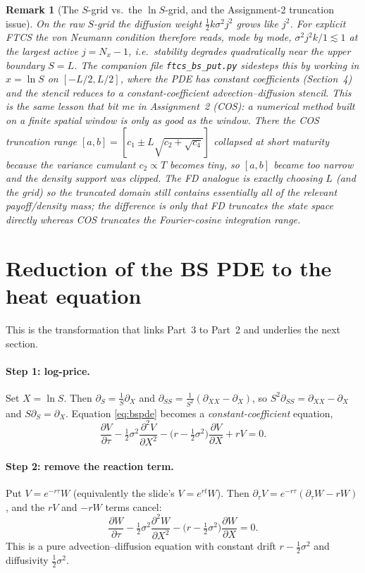 \documentclass[11pt]{article}
\newtheorem{remark}{Remark}
\begin{document}
\begin{remark}[The $S$-grid vs.\ the $\ln S$-grid, and the Assignment-2 truncation issue]
On the raw $S$-grid the diffusion weight $\tfrac12 k\sigma^2 j^2$ grows like $j^2$. For explicit FTCS the von Neumann condition therefore reads, mode by mode, $\sigma^2 j^2 k/1 \lesssim 1$ at the largest active $j=N_x-1$, i.e.\ stability degrades quadratically near the upper boundary $S=L$. The companion file \texttt{ftcs\_bs\_put.py} sidesteps this by working in $x=\ln S$ on $[-L/2,L/2]$, where the PDE has \emph{constant} coefficients (Section~4) and the stencil reduces to a constant-coefficient advection--diffusion stencil. This is the same lesson that bit me in Assignment~2 (COS): a numerical method built on a finite spatial window is only as good as the window. There the COS truncation range $[a,b]=[c_1\pm L\sqrt{c_2+\sqrt{c_4}}]$ collapsed at short maturity because the variance cumulant $c_2\propto T$ becomes tiny, so $[a,b]$ became too narrow and the density support was clipped. The FD analogue is exactly choosing $L$ (and the grid) so the truncated domain still contains essentially all of the relevant payoff/density mass; the difference is only that FD truncates the state space directly whereas COS truncates the Fourier-cosine integration range.
\end{remark}

\section{Reduction of the BS PDE to the heat equation}
This is the transformation that links Part~3 to Part~2 and underlies the next section.

\paragraph{Step 1: log-price.} Set $X=\ln S$. Then $\partial_S = \tfrac1S\partial_X$ and $\partial_{SS}=\tfrac1{S^2}(\partial_{XX}-\partial_X)$, so $S^2\partial_{SS}=\partial_{XX}-\partial_X$ and $S\partial_S=\partial_X$. Equation \eqref{eq:bspde} becomes a \emph{constant-coefficient} equation,
\begin{equation}
\frac{\partial V}{\partial\tau} - \tfrac12\sigma^2\frac{\partial^2 V}{\partial X^2} - \Big(r-\tfrac12\sigma^2\Big)\frac{\partial V}{\partial X} + rV = 0 .
\label{eq:logbs}
\end{equation}

\paragraph{Step 2: remove the reaction term.} Put $V=e^{-r\tau}W$ (equivalently the slide's $V=e^{rt}W$). Then $\partial_\tau V = e^{-r\tau}(\partial_\tau W - rW)$, and the $rV$ and $-rW$ terms cancel:
\begin{equation}
\frac{\partial W}{\partial\tau} - \tfrac12\sigma^2\frac{\partial^2 W}{\partial X^2} - \Big(r-\tfrac12\sigma^2\Big)\frac{\partial W}{\partial X} = 0 .
\label{eq:advdiff}
\end{equation}
This is a pure advection--diffusion equation with constant drift $r-\tfrac12\sigma^2$ and diffusivity $\tfrac12\sigma^2$.
\end{document}
